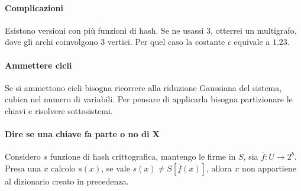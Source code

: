 \paragraph{Complicazioni}
Esistono versioni con più funzioni di hash. Se ne usassi $3$, otterrei un multigrafo, 
dove gli archi coinvolgono 3 vertici. Per quel caso la costante $c$ equivale a $1.23$.

\paragraph{Ammettere cicli}
Se si ammettono cicli bisogna ricorrere alla riduzione Gaussiana del sistema, cubica nel numero di variabili. 
Per pensare di applicarla bisogna partizionare le chiavi e risolvere sottosistemi.

\paragraph{Dire se una chiave fa parte o no di X}
Considero $s$ funzione di hash crittografica, mantengo le firme in $S$, sia $\bar{f} : U \longrightarrow 2^b$.
Presa una $x$ calcolo $s(x)$, se vale $s(x) \neq S[\bar{f}(x)]$, allora $x$ non appartiene 
al dizionario creato in precedenza.